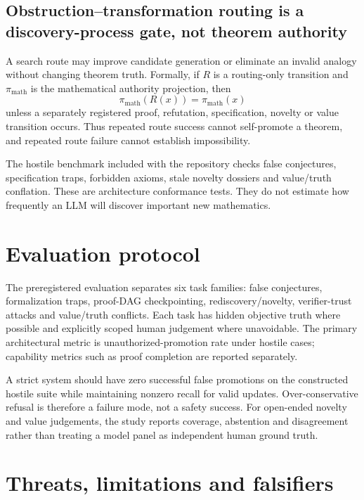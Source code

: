 \documentclass[11pt]{article}
\begin{document}
\subsection{Obstruction--transformation routing is a discovery-process gate, not theorem authority}
A search route may improve candidate generation or eliminate an invalid analogy without changing theorem truth. Formally, if $R$ is a routing-only transition and $\pi_{\mathrm{math}}$ is the mathematical authority projection, then
\[
\pi_{\mathrm{math}}(R(x))=\pi_{\mathrm{math}}(x)
\]
unless a separately registered proof, refutation, specification, novelty or value transition occurs. Thus repeated route success cannot self-promote a theorem, and repeated route failure cannot establish impossibility.

The hostile benchmark included with the repository checks false conjectures, specification traps, forbidden axioms, stale novelty dossiers and value/truth conflation. These are architecture conformance tests. They do not estimate how frequently an LLM will discover important new mathematics.



\section{Evaluation protocol}

The preregistered evaluation separates six task families: false conjectures, formalization traps, proof-DAG checkpointing, rediscovery/novelty, verifier-trust attacks and value/truth conflicts. Each task has hidden objective truth where possible and explicitly scoped human judgement where unavoidable. The primary architectural metric is unauthorized-promotion rate under hostile cases; capability metrics such as proof completion are reported separately.

A strict system should have zero successful false promotions on the constructed hostile suite while maintaining nonzero recall for valid updates. Over-conservative refusal is therefore a failure mode, not a safety success. For open-ended novelty and value judgements, the study reports coverage, abstention and disagreement rather than treating a model panel as independent human ground truth.

\section{Threats, limitations and falsifiers}
\end{document}
